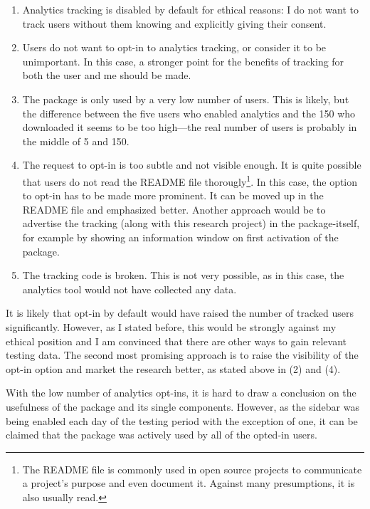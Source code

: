 \begin{description}
\begin{enumerate}
\def\labelenumi{\arabic{enumi}.}
\itemsep1pt\parskip0pt
\item
  Analytics tracking is disabled by default for ethical reasons: I do
  not want to track users without them knowing and explicitly giving
  their consent.
\item
  Users do not want to opt-in to analytics tracking, or consider it to
  be unimportant. In this case, a stronger point for the benefits of
  tracking for both the user and me should be made.
\item
  The package is only used by a very low number of users. This is
  likely, but the difference between the five users who enabled
  analytics and the 150 who downloaded it seems to be too high—the real
  number of users is probably in the middle of 5 and 150.
\item
  The request to opt-in is too subtle and not visible enough. It is
  quite possible that users do not read the README file
  thorougly\footnote{The README file is commonly used in open source projects to communicate a project’s purpose and even document it. Against many presumptions, it is also usually read.}.
  In this case, the option to opt-in has to be made more prominent. It
  can be moved up in the README file and emphasized better. Another
  approach would be to advertise the tracking (along with this research
  project) in the package-itself, for example by showing an information
  window on first activation of the package.
\item
  The tracking code is broken. This is not very possible, as in this
  case, the analytics tool would not have collected any data.
\end{enumerate}

It is likely that opt-in by default would have raised the number of
tracked users significantly. However, as I stated before, this would be
strongly against my ethical position and I am convinced that there are
other ways to gain relevant testing data. The second most promising
approach is to raise the visibility of the opt-in option and market the
research better, as stated above in (2) and (4).

With the low number of analytics opt-ins, it is hard to draw a
conclusion on the usefulness of the package and its single components.
However, as the sidebar was being enabled each day of the testing period
with the exception of one, it can be claimed that the package was
actively used by all of the opted-in users.
\end{description}

